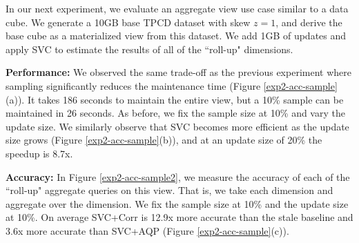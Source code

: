 

In our next experiment, we evaluate an aggregate view use case similar to a data cube.
We generate a 10GB base TPCD dataset with skew $z=1$, and derive the base cube as a materialized view from this dataset.
We add 1GB of updates and apply SVC to estimate the results of all of the ``roll-up" dimensions.

\textbf{Performance: }
We observed the same trade-off as the previous experiment where sampling significantly reduces the maintenance time (Figure \ref{exp2-acc-sample}(a)).
It takes 186 seconds to maintain the entire view, but a 10\% sample can be maintained in 26 seconds.
As before, we fix the sample size at 10\% and vary the update size.
We similarly observe that SVC becomes more efficient as the update size grows (Figure \ref{exp2-acc-sample}(b)), and at an update size of 20\%  the speedup is 8.7x.

\textbf{Accuracy: }
In Figure \ref{exp2-acc-sample2}, we measure the accuracy of each of the ``roll-up" aggregate queries on this view.
That is, we take each dimension and aggregate over the dimension.
We fix the sample size at 10\% and the update size at 10\%.
On average SVC+Corr is 12.9x more accurate than the stale baseline and 3.6x more accurate than SVC+AQP (Figure \ref{exp2-acc-sample}(c)). 


